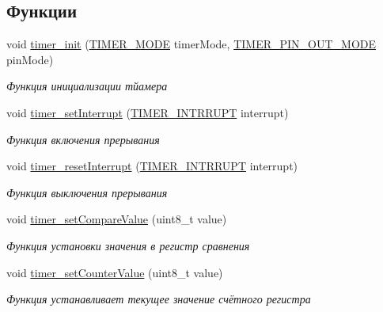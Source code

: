 \subsection*{Функции}
\begin{DoxyCompactItemize}
\item 
void \mbox{\hyperlink{group__timer_counter_gae5d2998a498c065480b09bd91826fe60}{timer\+\_\+init}} (\mbox{\hyperlink{group__timer_counter_ga15e57fd0ba6550341fe791c32292bea7}{T\+I\+M\+E\+R\+\_\+\+M\+O\+DE}} timer\+Mode, \mbox{\hyperlink{group__timer_counter_ga57a44f196c24e7284b9a836a60359532}{T\+I\+M\+E\+R\+\_\+\+P\+I\+N\+\_\+\+O\+U\+T\+\_\+\+M\+O\+DE}} pin\+Mode)
\begin{DoxyCompactList}\small\item\em Функция инициализации тйамера \end{DoxyCompactList}\item 
void \mbox{\hyperlink{group__timer_counter_ga9eb5899834154a7367fe526f519cbb00}{timer\+\_\+set\+Interrupt}} (\mbox{\hyperlink{group__timer_counter_ga2e7008f5da185cf8ce62fb0e5f3079ff}{T\+I\+M\+E\+R\+\_\+\+I\+N\+T\+R\+R\+U\+PT}} interrupt)
\begin{DoxyCompactList}\small\item\em Функция включения прерывания \end{DoxyCompactList}\item 
void \mbox{\hyperlink{group__timer_counter_gadc97b08f03ca2289d0110b67b9582fd3}{timer\+\_\+reset\+Interrupt}} (\mbox{\hyperlink{group__timer_counter_ga2e7008f5da185cf8ce62fb0e5f3079ff}{T\+I\+M\+E\+R\+\_\+\+I\+N\+T\+R\+R\+U\+PT}} interrupt)
\begin{DoxyCompactList}\small\item\em Функция выключения прерывания \end{DoxyCompactList}\item 
void \mbox{\hyperlink{group__timer_counter_gafee8b515db2ba6289144f4c927448731}{timer\+\_\+set\+Compare\+Value}} (uint8\+\_\+t value)
\begin{DoxyCompactList}\small\item\em Функция установки значения в регистр сравнения \end{DoxyCompactList}\item 
void \mbox{\hyperlink{group__timer_counter_ga04ad8cb0a5f2fbb3bb7f544ba86de5d7}{timer\+\_\+set\+Counter\+Value}} (uint8\+\_\+t value)
\begin{DoxyCompactList}\small\item\em Функция устанавливает текущее значение счётного регистра \end{DoxyCompactList}\item 

\end{DoxyCompactItemize}

